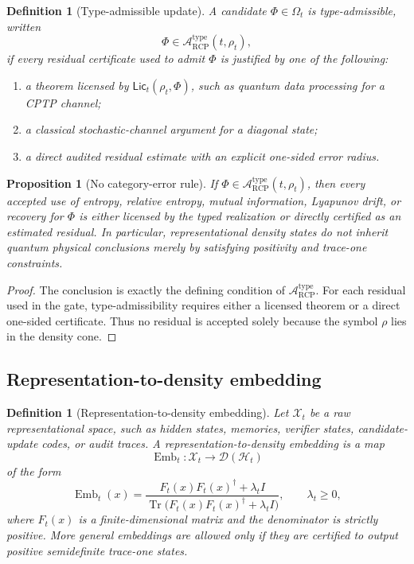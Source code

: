 \documentclass[11pt]{article}
\newtheorem{proposition}[theorem]{Proposition}
\newtheorem{definition}[theorem]{Definition}
\newcommand{\D}{\mathcal{D}}
\newcommand{\Hcal}{\mathcal{H}}
\newcommand{\Acal}{\mathcal{A}}
\newcommand{\Xcal}{\mathcal{X}}
\newcommand{\Tr}{\operatorname{Tr}}
\newcommand{\1}{\mathbf{1}}
\newcommand{\RCP}{\mathrm{RCP}}
\providecommand{\Embed}{\operatorname{Emb}}
\begin{document}
\begin{definition}[Type-admissible update]
\label{def:type_admissible_update}
A candidate \(\Phi\in\Omega_t\) is type-admissible, written
\[
\Phi\in\Acal_{\RCP}^{\mathrm{type}}(t,\rho_t),
\]
if every residual certificate used to admit \(\Phi\) is justified by one of the following:
\begin{enumerate}[label=(\alph*)]
    \item a theorem licensed by \(\mathsf{Lic}_t(\rho_t,\Phi)\), such as quantum data processing for a CPTP channel;
    \item a classical stochastic-channel argument for a diagonal state;
    \item a direct audited residual estimate with an explicit one-sided error radius.
\end{enumerate}
\end{definition}

\begin{proposition}[No category-error rule]
\label{prop:no_category_error_rule}
If \(\Phi\in\Acal_{\RCP}^{\mathrm{type}}(t,\rho_t)\), then every accepted use of entropy, relative entropy, mutual information, Lyapunov drift, or recovery for \(\Phi\) is either licensed by the typed realization or directly certified as an estimated residual.  In particular, representational density states do not inherit quantum physical conclusions merely by satisfying positivity and trace-one constraints.
\end{proposition}

\begin{proof}
The conclusion is exactly the defining condition of \(\Acal_{\RCP}^{\mathrm{type}}\).  For each residual used in the gate, type-admissibility requires either a licensed theorem or a direct one-sided certificate.  Thus no residual is accepted solely because the symbol \(\rho\) lies in the density cone.
\end{proof}

\subsection{Representation-to-density embedding}

\begin{definition}[Representation-to-density embedding]
\label{def:representation_to_density_embedding}
Let \(\Xcal_t\) be a raw representational space, such as hidden states, memories, verifier states, candidate-update codes, or audit traces.  A representation-to-density embedding is a map
\[
\Embed_t:\Xcal_t\to\D(\Hcal_t)
\]
of the form
\[
\Embed_t(x)
=
\frac{F_t(x)F_t(x)^\dagger+\lambda_t I}{\Tr\bigl(F_t(x)F_t(x)^\dagger+\lambda_t I\bigr)},
\qquad
\lambda_t\ge0,
\]
where \(F_t(x)\) is a finite-dimensional matrix and the denominator is strictly positive.  More general embeddings are allowed only if they are certified to output positive semidefinite trace-one states.
\end{definition}
\end{document}
